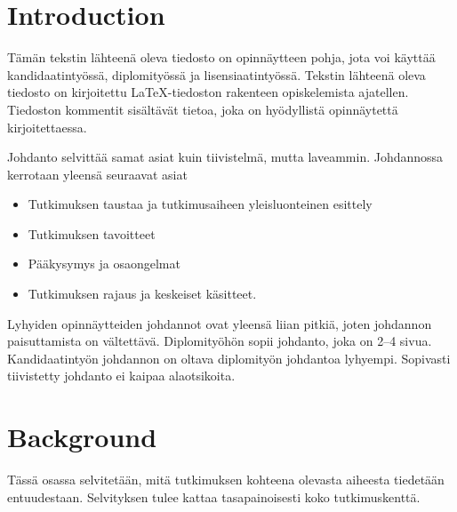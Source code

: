 \documentclass[english,12pt,a4paper,pdftex,elec,utf8]{aaltothesis}
\begin{document}
\section{Introduction}

\thispagestyle{empty}

T\"am\"an tekstin l\"ahteen\"a oleva tiedosto on opinn\"aytteen
pohja, jota voi k\"aytt\"a\"a kandidaatinty\"oss\"a, diplomity\"oss\"a ja
lisensiaatinty\"oss\"a. Tekstin 
l\"ahteen\"a oleva tiedosto on kirjoitettu  \LaTeX-tiedoston rakenteen
opiskelemista ajatellen. Tiedoston kommentit sis\"alt\"av\"at
tietoa, joka on hy\"odyllist\"a opinn\"aytett\"a kirjoitettaessa. 

Johdanto selvitt\"a\"a samat asiat kuin tiivistelm\"a, mutta
laveammin. Johdannossa kerrotaan yleens\"a seuraavat asiat

\begin{itemize}
\item[--]Tutkimuksen taustaa ja tutkimusaiheen yleisluonteinen esittely
\item[--]Tutkimuksen tavoitteet
\item[--]P\"a\"akysymys ja osaongelmat
\item[--]Tutkimuksen rajaus ja keskeiset k\"asitteet.
\end{itemize}

Lyhyiden opinn\"aytteiden johdannot ovat yleens\"a liian pitki\"a, joten
johdannon paisuttamista on v\"altett\"av\"a. Diplomity\"oh\"on sopii johdanto,
joka on 2--4 sivua. %
Kandidaatinty\"on johdannon on oltava diplomity\"on
johdantoa lyhyempi. Sopivasti tiivistetty johdanto ei kaipaa alaotsikoita.


\clearpage

\section{Background}

T\"ass\"a osassa selvitet\"a\"an, mit\"a tutkimuksen kohteena olevasta
aiheesta tiedet\"a\"an entuudestaan. Selvityksen tulee kattaa
tasapainoisesti koko tutkimuskentt\"a. 
\end{document}
